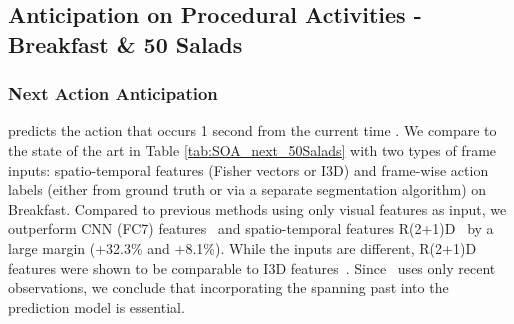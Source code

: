 \documentclass[runningheads]{llncs}
\begin{document}
\begin{table}[t] 
\centering
{}
\caption{Next action anticipation comparisons on Breakfast and 50Salads, given different frame inputs frame inputs, GT action labels, Fisher vectors and I3D features.}
\label{tab:SOA_next_50Salads} 
\end{table} 

\subsection{Anticipation on Procedural Activities - Breakfast \& 50 Salads} \label{sec:instructional_act}

\subsubsection{Next Action Anticipation}\label{sec:next_action}
predicts the action that occurs 1 second from the current time . We compare to the state of the art in Table \ref{tab:SOA_next_50Salads} with two types of frame inputs: spatio-temporal features (Fisher vectors or I3D) and frame-wise action labels (either from ground truth or via a separate segmentation algorithm) on Breakfast. Compared to previous methods using only visual features as input, we outperform CNN (FC7) features~\cite{vondrick2016anticipating} and spatio-temporal features R(2+1)D~\cite{miech2019leveraging} by a large margin (+32.3\% and +8.1\%). While the inputs are different, R(2+1)D features were shown to be comparable to I3D features~\cite{tran2018closer}. Since~\cite{miech2019leveraging} uses only recent observations, we conclude that incorporating the spanning past into the prediction model is essential.
\end{document}
